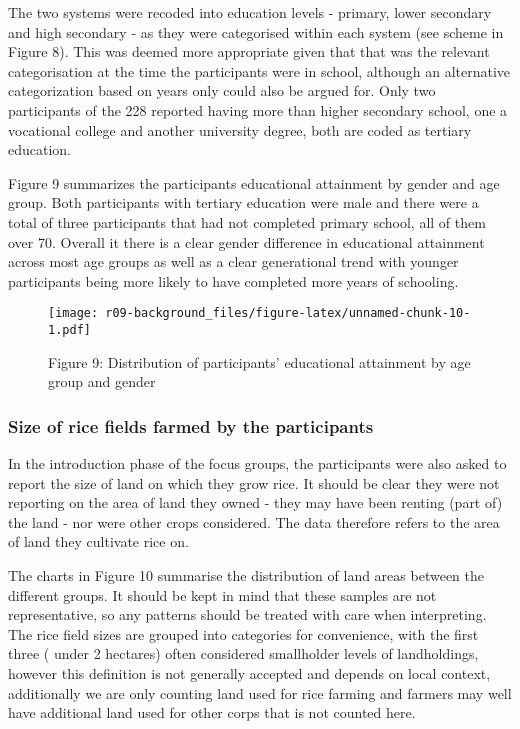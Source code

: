 \documentclass[]{article}
\begin{document}
The two systems were recoded into education levels - primary, lower
secondary and high secondary - as they were categorised within each
system (see scheme in Figure 8). This was deemed more appropriate given
that that was the relevant categorisation at the time the participants
were in school, although an alternative categorization based on years
only could also be argued for. Only two participants of the 228 reported
having more than higher secondary school, one a vocational college and
another university degree, both are coded as tertiary education.

Figure 9 summarizes the participants educational attainment by gender
and age group. Both participants with tertiary education were male and
there were a total of three participants that had not completed primary
school, all of them over 70. Overall it there is a clear gender
difference in educational attainment across most age groups as well as a
clear generational trend with younger participants being more likely to
have completed more years of schooling.

\begin{figure}
\centering
\texttt{[image: r09-background\_files/figure-latex/unnamed-chunk-10-1.pdf]}
\caption{Figure 9: Distribution of participants' educational attainment
by age group and gender}
\end{figure}

\hypertarget{size-of-rice-fields-farmed-by-the-participants}{%
\subsubsection{Size of rice fields farmed by the
participants}\label{size-of-rice-fields-farmed-by-the-participants}}

In the introduction phase of the focus groups, the participants were
also asked to report the size of land on which they grow rice. It should
be clear they were not reporting on the area of land they owned - they
may have been renting (part of) the land - nor were other crops
considered. The data therefore refers to the area of land they cultivate
rice on.

The charts in Figure 10 summarise the distribution of land areas between
the different groups. It should be kept in mind that these samples are
not representative, so any patterns should be treated with care when
interpreting. The rice field sizes are grouped into categories for
convenience, with the first three ( under 2 hectares) often considered
smallholder levels of landholdings, however this definition is not
generally accepted and depends on local context, additionally we are
only counting land used for rice farming and farmers may well have
additional land used for other corps that is not counted here.
\end{document}
